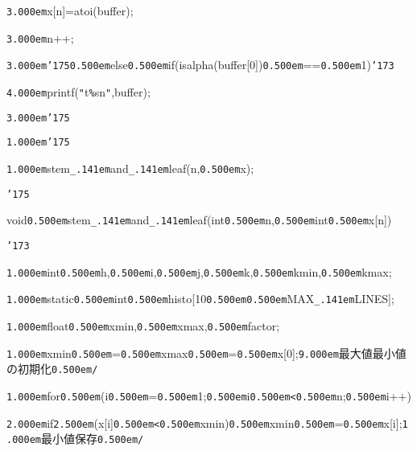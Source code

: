 \documentclass[uplatex,a4paper]{jsarticle}
\begin{document}
\noindent
{\tt\mc \kern3.000em}x[n]=atoi(buffer);

\noindent
{\tt\mc \kern3.000em}n++;

\noindent
{\tt\mc \kern3.000em}{\tt\char'175}{\tt\mc \kern0.500em}else{\tt\mc \kern0.500em}if(isalpha(buffer[0]){\tt\mc \kern0.500em}=={\tt\mc \kern0.500em}1){\tt\char'173}

\noindent
{\tt\mc \kern4.000em}printf({\tt "}{\tt{}}t{\tt\%}s{\tt{}}n{\tt "},buffer);

\noindent
{\tt\mc \kern3.000em}{\tt\char'175}

\noindent
{\tt\mc \kern1.000em}{\tt\char'175}

\noindent
{\tt\mc \kern1.000em}stem{\tt\_\kern.141em}and{\tt\_\kern.141em}leaf(n,{\tt\mc \kern0.500em}x);

\noindent
{\tt\char'175}

\noindent
\hfill

\noindent
void{\tt\mc \kern0.500em}stem{\tt\_\kern.141em}and{\tt\_\kern.141em}leaf(int{\tt\mc \kern0.500em}n,{\tt\mc \kern0.500em}int{\tt\mc \kern0.500em}x[n])

\noindent
{\tt\char'173}

\noindent
{\tt\mc \kern1.000em}int{\tt\mc \kern0.500em}h,{\tt\mc \kern0.500em}i,{\tt\mc \kern0.500em}j,{\tt\mc \kern0.500em}k,{\tt\mc \kern0.500em}kmin,{\tt\mc \kern0.500em}kmax;

\noindent
{\tt\mc \kern1.000em}static{\tt\mc \kern0.500em}int{\tt\mc \kern0.500em}histo[10{\tt\mc \kern0.500em}{\tt *}{\tt\mc \kern0.500em}MAX{\tt\_\kern.141em}LINES];

\noindent
{\tt\mc \kern1.000em}float{\tt\mc \kern0.500em}xmin,{\tt\mc \kern0.500em}xmax,{\tt\mc \kern0.500em}factor;

\noindent
{\tt\mc \kern1.000em}xmin{\tt\mc \kern0.500em}={\tt\mc \kern0.500em}xmax{\tt\mc \kern0.500em}={\tt\mc \kern0.500em}x[0];{\tt\mc \kern9.000em}\rm\mc {\tt /}{\tt *}{\tt\mc \kern0.500em}最大値最小値の初期化{\tt\mc \kern0.500em}{\tt *}{\tt /}\tt\mc 

\noindent
{\tt\mc \kern1.000em}for{\tt\mc \kern0.500em}(i{\tt\mc \kern0.500em}={\tt\mc \kern0.500em}1;{\tt\mc \kern0.500em}i{\tt\mc \kern0.500em}{\tt <}{\tt\mc \kern0.500em}n;{\tt\mc \kern0.500em}i++)

\noindent
{\tt\mc \kern2.000em}if{\tt\mc \kern2.500em}(x[i]{\tt\mc \kern0.500em}{\tt <}{\tt\mc \kern0.500em}xmin){\tt\mc \kern0.500em}xmin{\tt\mc \kern0.500em}={\tt\mc \kern0.500em}x[i];{\tt\mc \kern1.000em}\rm\mc {\tt /}{\tt *}{\tt\mc \kern0.500em}最小値保存{\tt\mc \kern0.500em}{\tt *}{\tt /}\tt\mc 
\end{document}
